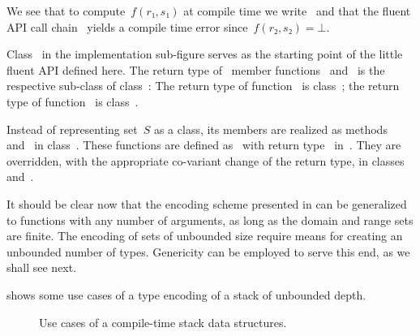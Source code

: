 We see that to compute~$f(r₁,s₁)$ at compile time we write~
  and that the fluent API call chain~ yields
  a compile time error since~$f(r₂, s₂)=⊥$.

Class~ in the implementation sub-figure serves as
  the starting point of the little fluent API defined here.
The return type of~ member functions~ and~
  is the respective sub-class of class~:
The return type of function~ is class~;
  the return type of function~ is class~.

Instead of representing set~$S$ as a class,
  its members are realized as methods~ and~ in class~.
These functions are defined as~ with return type~
  in~.
They are overridden, with the appropriate co-variant change of the return type,
  in classes~ and~.

It should be clear now that the encoding scheme presented
  in  can be generalized to functions
  with any number of arguments, as long as the domain and range sets are finite.
The encoding of sets of unbounded size require means for creating an unbounded
 number of types.
Genericity can be employed to serve this end, as we shall see next.



 shows some use cases of a type encoding of a stack of unbounded depth.

\begin{figure}[htb]
  \caption{\label{Figure:stack-use-cases}%
    Use cases of a compile-time stack data structures.
  }
\end{figure}

